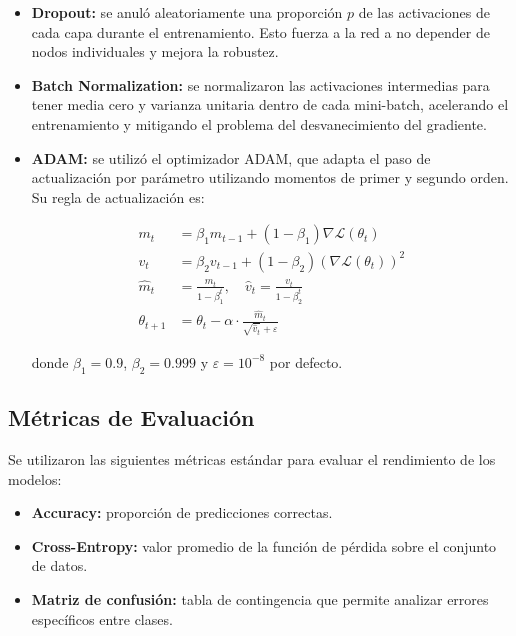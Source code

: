 \documentclass[11pt]{article}
\begin{document}
\begin{itemize}
    \item \textbf{Dropout:} se anuló aleatoriamente una proporción \( p \) de las activaciones de cada capa durante el entrenamiento. Esto fuerza a la red a no depender de nodos individuales y mejora la robustez.

    \item \textbf{Batch Normalization:} se normalizaron las activaciones intermedias para tener media cero y varianza unitaria dentro de cada mini-batch, acelerando el entrenamiento y mitigando el problema del desvanecimiento del gradiente.

    \item \textbf{ADAM:} se utilizó el optimizador ADAM, que adapta el paso de actualización por parámetro utilizando momentos de primer y segundo orden. Su regla de actualización es:

    \[
    \begin{aligned}
    m_t &= \beta_1 m_{t-1} + (1 - \beta_1) \nabla \mathcal{L}(\theta_t) \\
    v_t &= \beta_2 v_{t-1} + (1 - \beta_2) \left( \nabla \mathcal{L}(\theta_t) \right)^2 \\
    \hat{m}_t &= \frac{m_t}{1 - \beta_1^t}, \quad \hat{v}_t = \frac{v_t}{1 - \beta_2^t} \\
    \theta_{t+1} &= \theta_t - \alpha \cdot \frac{\hat{m}_t}{\sqrt{\hat{v}_t} + \varepsilon}
    \end{aligned}
    \]

    donde \( \beta_1 = 0.9 \), \( \beta_2 = 0.999 \) y \( \varepsilon = 10^{-8} \) por defecto.
\end{itemize}


\subsection*{Métricas de Evaluación}

Se utilizaron las siguientes métricas estándar para evaluar el rendimiento de los modelos:

\begin{itemize}
    \item \textbf{Accuracy:} proporción de predicciones correctas.

    \item \textbf{Cross-Entropy:} valor promedio de la función de pérdida sobre el conjunto de datos.

    \item \textbf{Matriz de confusión:} tabla de contingencia que permite analizar errores específicos entre clases.
\end{itemize}
\end{document}
